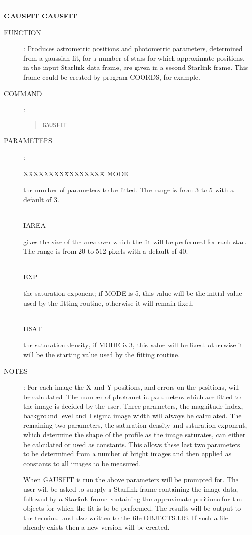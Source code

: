 \goodbreak
\rule{\textwidth}{0.3mm}
{\Large {\bf GAUSFIT} \hfill {\bf GAUSFIT}}
\begin{description}
\item [FUNCTION]:
Produces astrometric positions and photometric parameters, determined from a
gaussian fit, for a number of stars for which  approximate positions, in the
input Starlink data frame, are given in a second Starlink frame.
This frame could be created by program COORDS, for example.
\item [COMMAND]:
\begin{quote}
{\tt GAUSFIT}
\end{quote}
\item [PARAMETERS] :
\begin{tabbing}
XXXXXXXX\=XXXXXXXX\=\kill
MODE\>\>\begin{minipage}[t]{100mm}
the number of parameters to be fitted.
The range is from 3 to 5 with a default of 3.
\end{minipage}\\
IAREA\>\>\begin{minipage}[t]{100mm}
gives the size of the area over which the fit will be performed for each star.
The range is from 20 to 512 pixels with a default of 40.
\end{minipage}\\
EXP\>\>\begin{minipage}[t]{100mm}
the saturation exponent; if MODE is 5, this value will be the initial value
used by the fitting routine, otherwise it will remain fixed.
\end{minipage}\\
DSAT\>\>\begin{minipage}[t]{100mm}
the saturation density; if MODE is 3, this value will be fixed, otherwise it
will be the starting value used by the fitting routine.
\end{minipage}
\end{tabbing}
\item [NOTES]:
For each image the X and Y positions, and errors on the positions, will be
calculated.
The number of photometric parameters which are fitted to the image is decided
by the user.
Three parameters, the magnitude index, background level and 1 sigma image width
will always be calculated.
The remaining two parameters, the saturation density and saturation exponent,
which determine the shape of the profile as the image saturates, can either be
calculated or used as  constants.
This allows these last two parameters to be determined from a number of bright
images and then applied as constants to all images to be measured.

When GAUSFIT is run the above parameters will be prompted for.
The user will be asked to supply a Starlink frame containing the image data,
followed by a Starlink frame containing the approximate positions for the
objects for which the fit is to be performed.
The results will be output to the terminal and also written to the file
OBJECTS.LIS.
If such a file already exists then a new version will be created.
\end{description}

